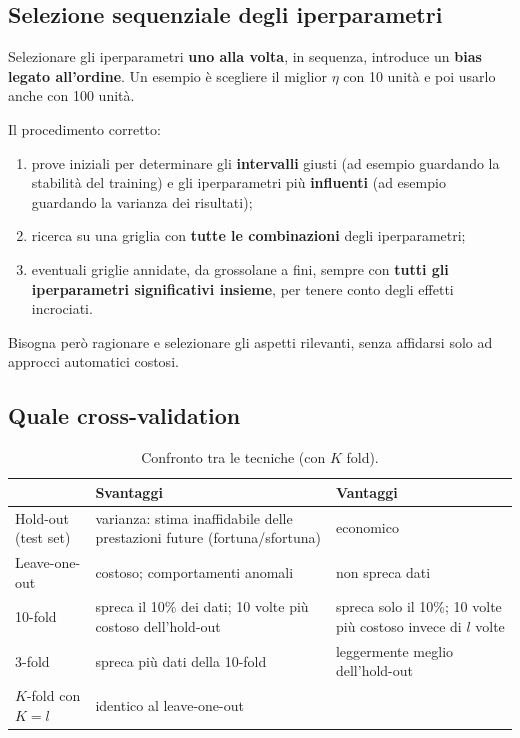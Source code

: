 \subsection{Selezione sequenziale degli iperparametri}
\begin{attenzione}
Selezionare gli iperparametri \textbf{uno alla volta}, in sequenza, introduce un \textbf{bias legato all'ordine}.
Un esempio è scegliere il miglior $\eta$ con 10 unità e poi usarlo anche con 100 unità.
\end{attenzione}
Il procedimento corretto:
\begin{enumerate}
  \item prove iniziali per determinare gli \textbf{intervalli} giusti (ad esempio guardando la stabilità del
        training) e gli iperparametri più \textbf{influenti} (ad esempio guardando la varianza dei risultati);
  \item ricerca su una griglia con \textbf{tutte le combinazioni} degli iperparametri;
  \item eventuali griglie annidate, da grossolane a fini, sempre con \textbf{tutti gli iperparametri significativi
        insieme}, per tenere conto degli effetti incrociati.
\end{enumerate}
Bisogna però ragionare e selezionare gli aspetti rilevanti, senza affidarsi solo ad approcci automatici costosi.

\subsection{Quale cross-validation}

\begin{table}[ht]
\centering\small
\caption{Confronto tra le tecniche (con $K$ fold).}
\begin{tabularx}{0.95\linewidth}{lXX}
\toprule
 & Svantaggi & Vantaggi \\
\midrule
Hold-out (test set) & varianza: stima inaffidabile delle prestazioni future (fortuna/sfortuna) & economico \\
Leave-one-out & costoso; comportamenti anomali & non spreca dati \\
10-fold & spreca il 10\% dei dati; 10 volte più costoso dell'hold-out & spreca solo il 10\%; 10 volte più costoso invece di $l$ volte \\
3-fold & spreca più dati della 10-fold & leggermente meglio dell'hold-out \\
$K$-fold con $K=l$ & identico al leave-one-out & \\
\bottomrule
\end{tabularx}
\end{table}

